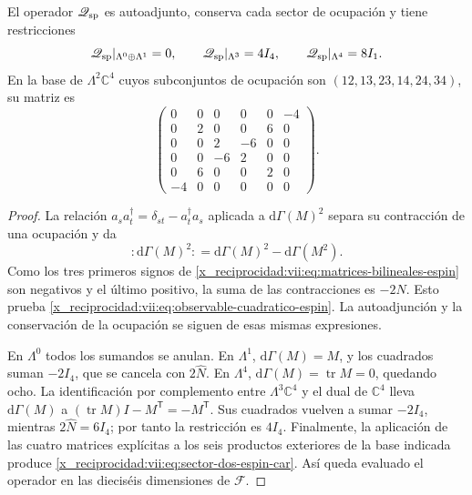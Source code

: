 \begin{proposition}
\label{x_reciprocidad:vii:prop:operador-espin-car}
El operador \(\widehat{\mathscr Q}_{\rm sp}\) es autoadjunto,
conserva cada sector de ocupación y tiene restricciones
\begin{equation}
 \widehat{\mathscr Q}_{\rm sp}|_{\Lambda^0\oplus\Lambda^1}=0,
 \qquad
 \widehat{\mathscr Q}_{\rm sp}|_{\Lambda^3}=4I_4,
 \qquad
 \widehat{\mathscr Q}_{\rm sp}|_{\Lambda^4}=8I_1.
 \label{x_reciprocidad:vii:eq:sectores-espin-car}
\end{equation}
En la base de \(\Lambda^2\mathbb C^4\) cuyos subconjuntos de
ocupación son \((12,13,23,14,24,34)\), su matriz es
\begin{equation}
 \begin{pmatrix}
 0&0&0&0&0&-4\\
 0&2&0&0&6&0\\
 0&0&2&-6&0&0\\
 0&0&-6&2&0&0\\
 0&6&0&0&2&0\\
 -4&0&0&0&0&0
 \end{pmatrix}.
 \label{x_reciprocidad:vii:eq:sector-dos-espin-car}
\end{equation}
\end{proposition}
\begin{proof}
La relación \(a_s a_t^\dagger=\delta_{st}-a_t^\dagger a_s\)
aplicada a \(\mathrm d\Gamma(M)^2\) separa su contracción de
una ocupación y da
\[
 :\!\mathrm d\Gamma(M)^2\!:
 =\mathrm d\Gamma(M)^2-\mathrm d\Gamma(M^2).
\]
Como los tres primeros signos de
\eqref{x_reciprocidad:vii:eq:matrices-bilineales-espin} son negativos y el último
positivo, la suma de las contracciones es \(-2\widehat N\).
Esto prueba \eqref{x_reciprocidad:vii:eq:observable-cuadratico-espin}.
La autoadjunción y la conservación de la ocupación se siguen de
esas mismas expresiones.

En \(\Lambda^0\) todos los sumandos se anulan. En \(\Lambda^1\),
\(\mathrm d\Gamma(M)=M\), y los cuadrados suman \(-2I_4\),
que se cancela con \(2\widehat N\). En \(\Lambda^4\),
\(\mathrm d\Gamma(M)=\operatorname{tr}M=0\), quedando ocho.
La identificación por complemento entre \(\Lambda^3\mathbb C^4\)
y el dual de \(\mathbb C^4\) lleva
\(\mathrm d\Gamma(M)\) a
\((\operatorname{tr}M)I-M^{\mathsf T}=-M^{\mathsf T}\).
Sus cuadrados vuelven a sumar \(-2I_4\), mientras
\(2\widehat N=6I_4\); por tanto la restricción es \(4I_4\).
Finalmente, la aplicación de las cuatro matrices explícitas a los
seis productos exteriores de la base indicada produce
\eqref{x_reciprocidad:vii:eq:sector-dos-espin-car}. Así queda evaluado el operador
en las dieciséis dimensiones de \(\mathcal F\).
\end{proof}

